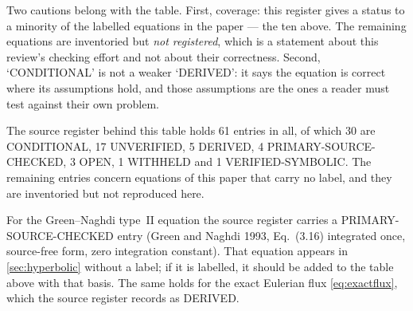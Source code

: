 Two cautions belong with the table. First, coverage: this register gives a status to a minority of the
labelled equations in the paper --- the ten above. The remaining equations are inventoried but
\emph{not registered}, which is a statement about this review's checking effort and not about their
correctness. Second, `CONDITIONAL' is not a weaker `DERIVED': it says the equation is correct where its
assumptions hold, and those assumptions are the ones a reader must test against their own problem.

The source register behind this table holds 61 entries in all, of which 30 are CONDITIONAL, 17
UNVERIFIED, 5 DERIVED, 4 PRIMARY-SOURCE-CHECKED, 3 OPEN, 1 WITHHELD and 1 VERIFIED-SYMBOLIC. The remaining
entries concern equations of this paper that carry no label, and they are inventoried but not reproduced
here.

For the Green--Naghdi type~II equation the source register carries a PRIMARY-SOURCE-CHECKED entry (Green
and Naghdi 1993, Eq.~(3.16) integrated once, source-free form, zero integration constant). That equation
appears in \cref{sec:hyperbolic} without a label; if it is labelled, it should be added to the table above
with that basis. The same holds for the exact Eulerian flux \eqref{eq:exactflux}, which the source register
records as DERIVED.
